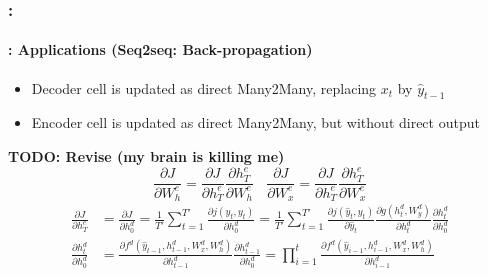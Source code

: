 \documentclass[xcolor=table]{beamer}
\begin{document}
\begin{frame}
	\frametitle{\insertshortsubtitle: \insertsection}
	\framesubtitle{\insertsubsection: Applications (Seq2seq: Back-propagation)}
	
	\begin{itemize}
		\item Decoder cell is updated as direct Many2Many, replacing $x_t$ by $\hat{y}_{t-1}$
		\item Encoder cell is updated as direct Many2Many, but without direct output
	\end{itemize}
	
	\textbf{TODO: Revise (my brain is killing me)}
	\[\frac{\partial J}{\partial W^e_h} = \frac{\partial J}{\partial h^e_T} \frac{\partial h^e_T}{\partial W^e_h} 
	\ \ \ \
	\frac{\partial J}{\partial W^e_x}  = \frac{\partial J}{\partial h^e_T} \frac{\partial h^e_T}{\partial W^e_x} 
	\]
	\begin{align*}
%		
		\frac{\partial J}{\partial h^e_T} & = \frac{\partial J}{\partial h^d_0}
		 = \frac{1}{T'} \sum_{t=1}^{T'} \frac{\partial j(\hat{y}_t, y_t)}{\partial h^d_0} 
		 = \frac{1}{T'} \sum_{t=1}^{T'} 
		 \frac{\partial j(\hat{y}_t, y_t)}{\partial \hat{y}_t} 
		 \frac{\partial g(h^d_t, W^d_y)}{\partial h^d_t} 
		 \frac{\partial h^d_t}{\partial h^d_0}\\
%		 
		 \frac{\partial h^d_t}{\partial h^d_0} & = 
		 \frac{\partial f^d(\hat{y}_{t-1}, h^d_{t-1}, W^d_x, W^d_h)}{\partial h^d_{t-1}} \frac{\partial h^d_{t-1}}{\partial h^d_{0}} 
		 = \prod_{i=1}^{t} \frac{\partial f^d(\hat{y}_{i-1}, h^d_{i-1}, W^d_x, W^d_h)}{\partial h^d_{i-1}}\\
	\end{align*}
	
\end{frame}
\end{document}
